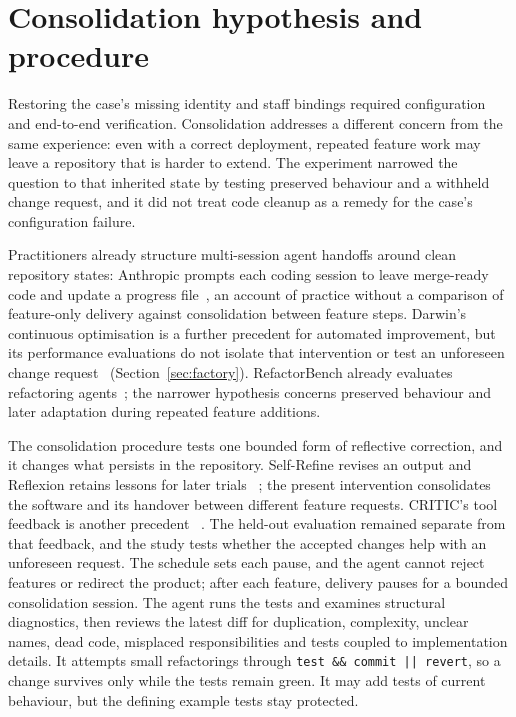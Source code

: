 \documentclass[11pt,a4paper]{article}
\begin{document}
\FloatBarrier


\section{Consolidation hypothesis and procedure}\label{sec:harness}

Restoring the case's missing identity and staff bindings required
configuration and end-to-end verification. Consolidation addresses a
different concern from the same experience: even with a correct
deployment, repeated feature work may leave a repository that is harder to
extend. The experiment narrowed the question to that inherited state by testing preserved behaviour and a withheld change request, and it
did not treat code cleanup as a remedy for the case's configuration failure.

Practitioners already structure multi-session agent handoffs around clean
repository states: Anthropic prompts each coding session to leave merge-ready
code and update a progress file~\cite{anthropic2025harness}, an account of
practice without a comparison of feature-only delivery against
consolidation between feature steps.
Darwin's continuous optimisation is a further precedent for automated
improvement, but its performance evaluations do not isolate that intervention
or test an unforeseen change request~\cite{pavlenko2026factory}
(Section~\ref{sec:factory}). RefactorBench already evaluates refactoring
agents~\cite{gautam2025refactorbench}; the narrower hypothesis concerns preserved
behaviour and later adaptation during repeated feature additions.

The consolidation procedure tests one bounded form of reflective
correction, and it changes what persists in the repository. Self-Refine revises
an output and Reflexion retains lessons for later trials
~\cite{madaan2023selfrefine,shinn2023reflexion}; the present intervention
consolidates the software and its handover between different
feature requests. CRITIC's tool feedback is another precedent
~\cite{gou2024critic}. The held-out evaluation remained separate from that
feedback, and the study tests whether the accepted changes help with an
unforeseen request. The schedule sets each pause, and the agent cannot reject
features or redirect the product; after each feature, delivery pauses for
a bounded consolidation session.
The agent runs the tests and examines structural diagnostics, then reviews
the latest diff for duplication, complexity, unclear names, dead code,
misplaced responsibilities and tests coupled to implementation details.
It attempts small refactorings through
\texttt{test \&\& commit || revert}, so a change survives
only while the tests remain green. It may add tests of current behaviour,
but the defining example tests stay protected.
\end{document}
